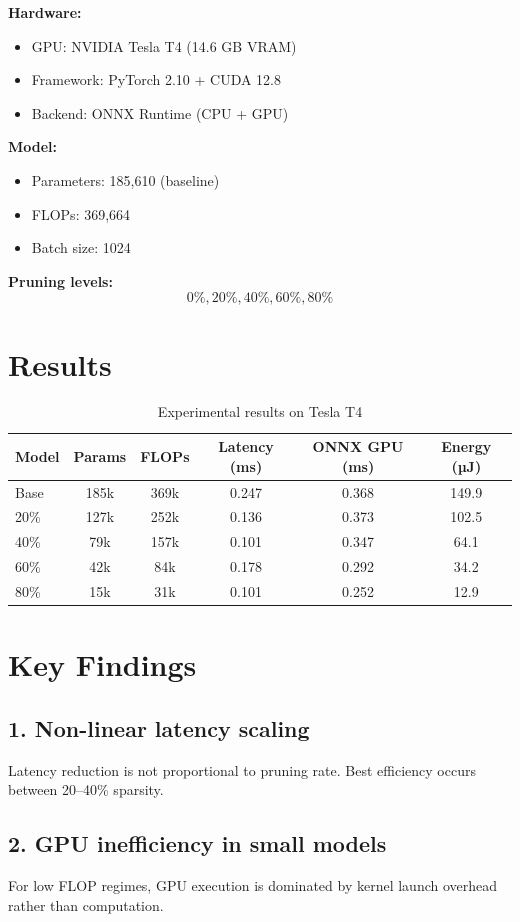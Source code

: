 \documentclass{article}
\begin{document}
\textbf{Hardware:}
\begin{itemize}
    \item GPU: NVIDIA Tesla T4 (14.6 GB VRAM)
    \item Framework: PyTorch 2.10 + CUDA 12.8
    \item Backend: ONNX Runtime (CPU + GPU)
\end{itemize}

\textbf{Model:}
\begin{itemize}
    \item Parameters: 185,610 (baseline)
    \item FLOPs: 369,664
    \item Batch size: 1024
\end{itemize}

\textbf{Pruning levels:}
\[
0\%, 20\%, 40\%, 60\%, 80\%
\]

\section{Results}

\begin{table}[h]
\centering
\caption{Experimental results on Tesla T4}
\begin{tabular}{lccccc}
\toprule
Model & Params & FLOPs & Latency (ms) & ONNX GPU (ms) & Energy (µJ) \\
\midrule
Base & 185k & 369k & 0.247 & 0.368 & 149.9 \\
20\% & 127k & 252k & 0.136 & 0.373 & 102.5 \\
40\% & 79k  & 157k & 0.101 & 0.347 & 64.1 \\
60\% & 42k  & 84k  & 0.178 & 0.292 & 34.2 \\
80\% & 15k  & 31k  & 0.101 & 0.252 & 12.9 \\
\bottomrule
\end{tabular}
\end{table}

\section{Key Findings}

\subsection{1. Non-linear latency scaling}
Latency reduction is not proportional to pruning rate. Best efficiency occurs between 20–40\% sparsity.

\subsection{2. GPU inefficiency in small models}
For low FLOP regimes, GPU execution is dominated by kernel launch overhead rather than computation.
\end{document}
